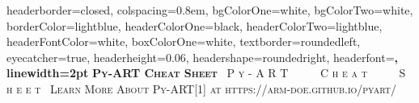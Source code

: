 \documentclass[potrait, z1paper, fontscale=0.33]{baposter} %
\begin{document}
\begin{poster}
{\begin{flushleft}
\begin{tabular}{@{}ll@{}}
\end{tabular}
\end{flushleft}

}

\end{poster}
\newpage


\begin{poster}
{
headerborder=closed, colspacing=0.8em, bgColorOne=white, bgColorTwo=white, borderColor=lightblue, headerColorOne=black, headerColorTwo=lightblue,
headerFontColor=white, boxColorOne=white, textborder=roundedleft, eyecatcher=true, headerheight=0.06\textheight, headershape=roundedright, headerfont=\Large\bf\textsc, linewidth=2pt
}
{\bf\textsc{Py-ART Cheat Sheet}\vspace{0.5em}} %
{\textsc{\ P y - A R T \ \ \ \ \ C h e a t \ \ \ \ \ S h e e t\ \hspace{12pt}}}
{\textsc{Learn More About Py-ART[1] at https://arm-doe.github.io/pyart/ \hspace{12pt}}}


\end{poster}
\end{document}
